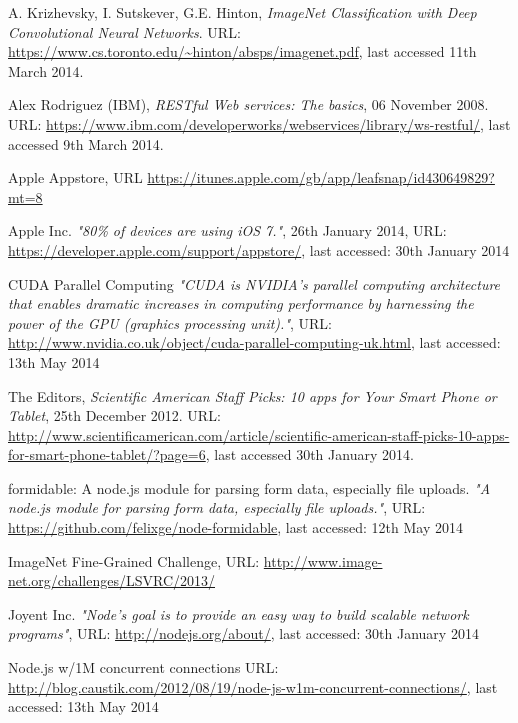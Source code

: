 \documentclass[a4paper,11pt]{article}
\begin{document}
\begin{description}
\begin{thebibliography}{1}
 A. Krizhevsky, I. Sutskever, G.E. Hinton,
  \emph{ImageNet Classiﬁcation with Deep Convolutional Neural Networks}.
 URL: \url{https://www.cs.toronto.edu/~hinton/absps/imagenet.pdf}, last accessed 11th March 2014.

 Alex Rodriguez (IBM),
  \emph{RESTful Web services: The basics}, 06 November 2008.\\
 URL: \url{https://www.ibm.com/developerworks/webservices/library/ws-restful/}, last accessed 9th March 2014.

  Apple Appstore, 
  URL \url{https://itunes.apple.com/gb/app/leafsnap/id430649829?mt=8}

	Apple Inc.
	\emph{"80\% of devices are using iOS 7."}, 26th January 2014,
	URL: \url{https://developer.apple.com/support/appstore/}, last accessed: 30th January 2014

	CUDA Parallel Computing
	\emph{"CUDA is NVIDIA’s parallel computing architecture that enables dramatic increases in computing performance by harnessing the power of the GPU (graphics processing unit)."},
	URL: \url{http://www.nvidia.co.uk/object/cuda-parallel-computing-uk.html}, last accessed: 13th May 2014

 The Editors,
  \emph{Scientific American Staff Picks: 10 apps for Your Smart Phone or Tablet}, 25th December 2012.
 URL: \url{http://www.scientificamerican.com/article/scientific-american-staff-picks-10-apps-for-smart-phone-tablet/?page=6}, last accessed 30th January 2014.

	formidable: A node.js module for parsing form data, especially file uploads.
	\emph{"A node.js module for parsing form data, especially file uploads."},
	URL: \url{https://github.com/felixge/node-formidable}, last accessed: 12th May 2014

  ImageNet Fine-Grained Challenge,
   URL: \url{http://www.image-net.org/challenges/LSVRC/2013/}

	Joyent Inc.
	\emph{"Node's goal is to provide an easy way to build scalable network programs"},
	URL: \url{http://nodejs.org/about/}, last accessed: 30th January 2014
	

	Node.js w/1M concurrent connections
	URL: \url{http://blog.caustik.com/2012/08/19/node-js-w1m-concurrent-connections/}, last accessed: 13th May 2014


\end{thebibliography}
\end{description}
\end{document}

